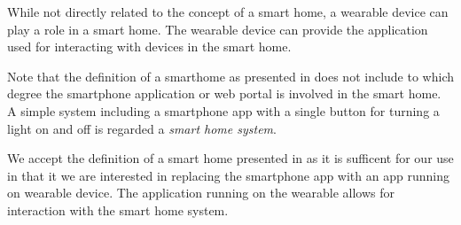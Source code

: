 While not directly related to the concept of a smart home, a wearable device can play a role in a smart home. The wearable device can provide the application used for interacting with devices in the smart home.

Note that the definition of a smarthome as presented in \cite{SMARTHOMETREND} does not include to which degree the smartphone application or web portal is involved in the smart home. A simple system including a smartphone app with a single button for turning a light on and off is regarded a \emph{smart home system}.

We accept the definition of a smart home presented in \cite{SMARTHOMETREND} as it is sufficent for our use in that it we are interested in replacing the smartphone app with an app running on wearable device. The application running on the wearable allows for interaction with the smart home system.

